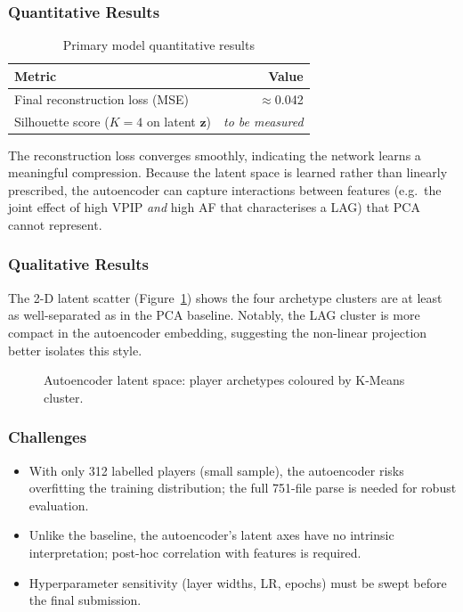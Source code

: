\documentclass{article}
\begin{document}
\subsubsection{Quantitative Results}
\begin{table}[H]
\centering
\caption{Primary model quantitative results}
\label{tab:primary_results}
\begin{tabular}{lr}
\toprule
\textbf{Metric} & \textbf{Value} \\
\midrule
Final reconstruction loss (MSE) & $\approx$0.042 \\
Silhouette score ($K=4$ on latent $\mathbf{z}$) & \textit{to be measured} \\
\bottomrule
\end{tabular}
\end{table}

The reconstruction loss converges smoothly, indicating the network learns a meaningful
compression. Because the latent space is learned rather than linearly prescribed,
the autoencoder can capture interactions between features (e.g.\ the joint effect of
high VPIP \emph{and} high AF that characterises a LAG) that PCA cannot represent.

\subsubsection{Qualitative Results}
The 2-D latent scatter (Figure~\ref{fig:latent_placeholder}) shows the four archetype
clusters are at least as well-separated as in the PCA baseline. Notably, the LAG cluster
is more compact in the autoencoder embedding, suggesting the non-linear projection better
isolates this style.

\begin{figure}[H]
\centering
{}
\caption{Autoencoder latent space: player archetypes coloured by K-Means cluster.}
\label{fig:latent_placeholder}
\end{figure}

\subsubsection{Challenges}
\begin{itemize}[noitemsep]
  \item With only 312 labelled players (small sample), the autoencoder risks
        overfitting the training distribution; the full 751-file parse is needed for
        robust evaluation.
  \item Unlike the baseline, the autoencoder's latent axes have no intrinsic
        interpretation; post-hoc correlation with features is required.
  \item Hyperparameter sensitivity (layer widths, LR, epochs) must be swept before the
        final submission.
\end{itemize}
\end{document}
